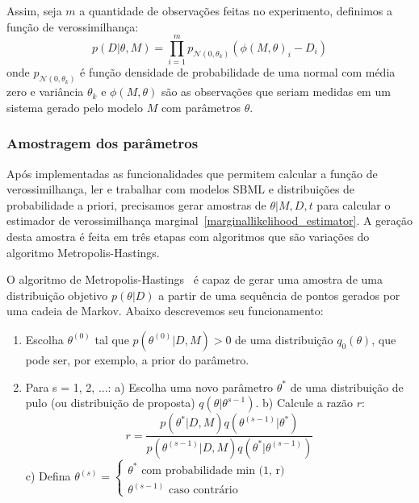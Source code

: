 \documentclass[12pt]{article}
\begin{document}
Assim, seja $m$ a quantidade de observações feitas no experimento, 
definimos a função de verossimilhança:
\begin{equation}\label{likelihood}
    p (D | \theta, M) = \prod_{i = 1}^m p_{\mathcal{N} (0, \theta_k)} (\phi (M, \theta)_i - D_i)
\end{equation}
onde $p_{\mathcal{N} (0, \theta_k)}$ é função densidade de probabilidade
de uma normal com média zero e variância $\theta_k$ e $\phi (M, \theta)$
são as observações que seriam medidas em um sistema gerado pelo modelo 
$M$ com parâmetros $\theta$.

\subsubsection{Amostragem dos parâmetros}
Após implementadas as funcionalidades que permitem calcular a função
de verossimilhança, ler e trabalhar com modelos SBML e distribuições de 
probabilidade a priori, precisamos gerar amostras de $\theta | M, D, t$
para calcular o estimador de verossimilhança 
marginal~\ref{marginallikelihood_estimator}. A geração desta amostra é
feita em três etapas com algoritmos que são variações do algoritmo 
Metropolis-Hastings.

O algoritmo de Metropolis-Hastings~\cite{BayesianDataAnalysis} é capaz 
de gerar uma amostra de uma distribuição objetivo $p (\theta | D)$ a 
partir de uma sequência de pontos gerados por uma cadeia de Markov. 
Abaixo descrevemos seu funcionamento:
\begin{enumerate}
    \item Escolha $\theta^{(0)}$ tal que $p(\theta^{(0)} | D, M) > 0$ de 
        uma distribuição $q_0(\theta)$, que pode ser, por exemplo, a
        prior do parâmetro.
    \item Para s = 1, 2, ...:
        \subitem a) Escolha uma novo parâmetro $\theta^*$ de uma 
        distribuição de pulo (ou distribuição de proposta) 
        $q (\theta | \theta^{s - 1})$.
        \subitem b) Calcule a razão $r$:
        \begin{equation}
            r = \frac{p(\theta^*| D, M) q(\theta^{(s - 1)} | \theta^*)}
                     {p(\theta^{(s - 1)} | D, M) q(\theta^* | \theta^{(s - 1)})}
        \end{equation}
        \subitem c) Defina $\theta^{(s)} = 
            \begin{cases}
                \theta^* \text{ com probabilidade min (1, r)}\\
                \theta^{(s - 1)} \text{ caso contrário}
            \end{cases}$
\end{enumerate}
\end{document}
